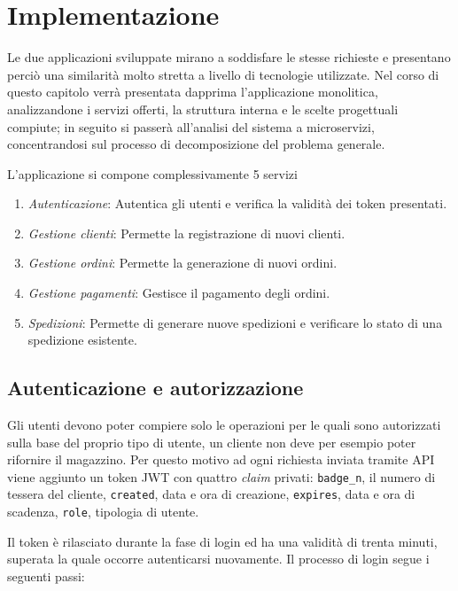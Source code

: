 \chapter{Implementazione}

	Le due applicazioni sviluppate mirano a soddisfare le stesse richieste e presentano perciò una similarità molto stretta a livello di tecnologie utilizzate.
	Nel corso di questo capitolo verrà presentata dapprima l'applicazione monolitica, analizzandone i servizi offerti, la struttura interna e le scelte progettuali compiute;
	in seguito si passerà all'analisi del sistema a microservizi, concentrandosi sul processo di decomposizione del problema generale.
	
	L'applicazione si compone complessivamente 5 servizi
	
	\begin{enumerate}
		\item \emph{Autenticazione}:
			Autentica gli utenti e verifica la validità dei token presentati.
		
		\item \emph{Gestione clienti}:
			Permette la registrazione di nuovi clienti.
			
		\item \emph{Gestione ordini}:
			Permette la generazione di nuovi ordini.
			
		\item \emph{Gestione pagamenti}:
			Gestisce il pagamento degli ordini.
			
		\item \emph{Spedizioni}:
			Permette di generare nuove spedizioni e verificare lo stato di una spedizione esistente.
	\end{enumerate}
	

\section{Autenticazione e autorizzazione}

	Gli utenti devono poter compiere solo le operazioni per le quali sono autorizzati sulla base del proprio tipo di utente, un cliente non deve per esempio poter rifornire il magazzino.
	Per questo motivo ad ogni richiesta inviata tramite API viene aggiunto un token JWT con quattro \emph{claim} privati: \texttt{badge\_n}, il numero di tessera del cliente, \texttt{created}, data e ora di creazione, \texttt{expires}, data e ora di scadenza, \texttt{role}, tipologia di utente.
	
	Il token è rilasciato durante la fase di login ed ha una validità di trenta minuti, superata la quale occorre autenticarsi nuovamente.
	Il processo di login segue i seguenti passi:
	
